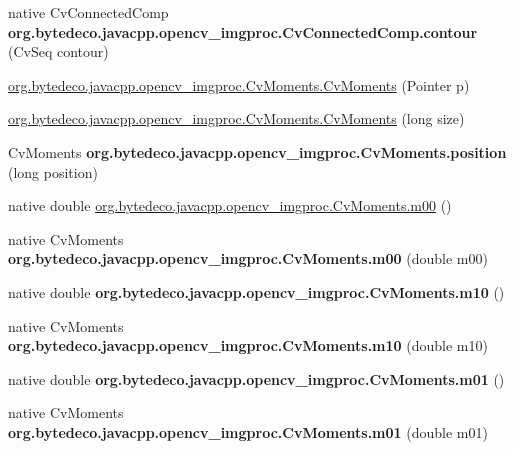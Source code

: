 \begin{DoxyCompactItemize}
\item 
\mbox{\label{group__imgproc_gad8de559246ca9f80a8e3f01c99e85b4b}} 
native Cv\+Connected\+Comp {\bfseries org.\+bytedeco.\+javacpp.\+opencv\+\_\+imgproc.\+Cv\+Connected\+Comp.\+contour} (Cv\+Seq contour)
\item 
\hyperlink{group__imgproc_ga7a9cbb0d2d4af395eb854396d5640ddb}{org.\+bytedeco.\+javacpp.\+opencv\+\_\+imgproc.\+Cv\+Moments.\+Cv\+Moments} (Pointer p)
\item 
\hyperlink{group__imgproc_ga2608f0796eed0d0a7b7bcd8f95ce04c1}{org.\+bytedeco.\+javacpp.\+opencv\+\_\+imgproc.\+Cv\+Moments.\+Cv\+Moments} (long size)
\item 
\mbox{\label{group__imgproc_ga62b495799b648c5eb31b420ff6c35f9b}} 
Cv\+Moments {\bfseries org.\+bytedeco.\+javacpp.\+opencv\+\_\+imgproc.\+Cv\+Moments.\+position} (long position)
\item 
native double \hyperlink{group__imgproc_ga9d5e9f3992ad7240cc2adc6fad3abef7}{org.\+bytedeco.\+javacpp.\+opencv\+\_\+imgproc.\+Cv\+Moments.\+m00} ()
\item 
\mbox{\label{group__imgproc_ga8b82ec359552de621c76a1e242ba64e7}} 
native Cv\+Moments {\bfseries org.\+bytedeco.\+javacpp.\+opencv\+\_\+imgproc.\+Cv\+Moments.\+m00} (double m00)
\item 
\mbox{\label{group__imgproc_gad11c3fe5cac315a80c52ec5ebf96263a}} 
native double {\bfseries org.\+bytedeco.\+javacpp.\+opencv\+\_\+imgproc.\+Cv\+Moments.\+m10} ()
\item 
\mbox{\label{group__imgproc_ga7555b706153a942713a4c2156c1b5622}} 
native Cv\+Moments {\bfseries org.\+bytedeco.\+javacpp.\+opencv\+\_\+imgproc.\+Cv\+Moments.\+m10} (double m10)
\item 
\mbox{\label{group__imgproc_ga768c51843dbbcac8159093e19d2b552e}} 
native double {\bfseries org.\+bytedeco.\+javacpp.\+opencv\+\_\+imgproc.\+Cv\+Moments.\+m01} ()
\item 
\mbox{\label{group__imgproc_ga19ca56463e146fbd8170e0fdf48bf863}} 
native Cv\+Moments {\bfseries org.\+bytedeco.\+javacpp.\+opencv\+\_\+imgproc.\+Cv\+Moments.\+m01} (double m01)
\item 

\end{DoxyCompactItemize}
